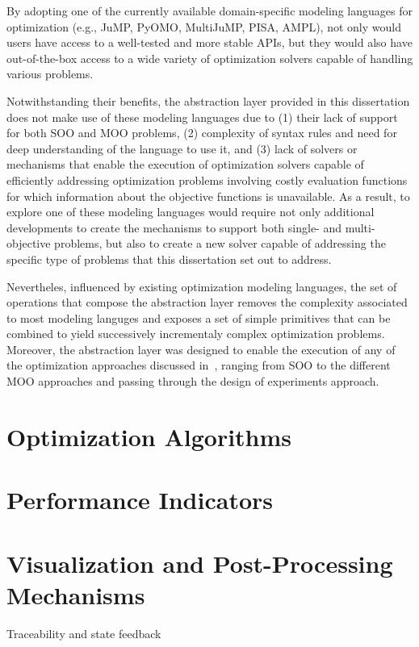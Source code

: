 By adopting one of the currently available domain-specific modeling languages for optimization (e.g., JuMP, PyOMO, MultiJuMP, PISA, AMPL), not only would users have access to a well-tested and more stable \acp{API}, but they would also have out-of-the-box access to a wide variety of optimization solvers capable of handling various problems. 

Notwithstanding their benefits, the abstraction layer provided in this dissertation does not make use of these modeling languages due to (1) their lack of support for both \ac{SOO} and \ac{MOO} problems, (2) complexity of syntax rules and need for deep understanding of the language to use it, and (3) lack of solvers or mechanisms that enable the execution of optimization solvers capable of efficiently addressing optimization problems involving costly evaluation functions for which information about the objective functions is unavailable. As a result, to explore one of these modeling languages would require not only additional developments to create the mechanisms to support both single- and multi-objective problems, but also to create a new solver capable of addressing the specific type of problems that this dissertation set out to address. 

Nevertheles, influenced by existing optimization modeling languages, the set of operations that compose the abstraction layer removes the complexity associated to most modeling languges and exposes a set of simple primitives that can be combined to yield successively incrementaly complex optimization problems. Moreover, the abstraction layer was designed to enable the execution of any of the optimization approaches discussed in~, ranging from \ac{SOO} to the different \ac{MOO} approaches and passing through the design of experiments approach. 

\section{Optimization Algorithms}

\section{Performance Indicators}

\section{Visualization and Post-Processing Mechanisms}
Traceability and state feedback

